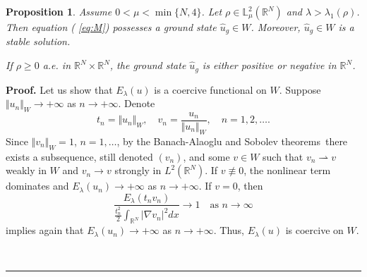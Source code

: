 \documentclass[12pt,thmsa]{article}
\newtheorem{proposition}[theorem]{Proposition}
\newenvironment{proof}[1][Proof]{\noindent\textbf{#1.} }{\ \rule{0.5em}{0.5em}}
\begin{document}
\begin{proposition}
\label{propGS} Assume $0<\mu <\min \{N,4\}$. Let $\rho \in \mathbb{L}_{\mu
}^{2}(\mathbb{R}^{N})$ and $\lambda >\lambda _{1}(\rho )$. Then equation (%
\ref{eq:M}) possesses a ground state $\hat{u}_{g}\in W$. Moreover, $\hat{u}%
_{g}\in W$ is a stable solution.

If $\rho \geq 0$ a.e. in $\mathbb{R}^N\times \mathbb{R}^N$, the ground state
$\hat{u}_g$ is either positive or negative in $\mathbb{R}^{N}$.
\end{proposition}

\begin{proof}
Let us show that $E_{\lambda }(u)$ is a coercive functional on $W$. Suppose $%
\Vert u_{n}\Vert _{W}\rightarrow +\infty $ as $n\rightarrow +\infty $.
Denote
\begin{equation*}
t_{n}=\Vert u_{n}\Vert _{W},\quad v_{n}=\frac{u_{n}}{\Vert u_{n}\Vert _{W}}%
,\quad n=1,2,\dots .
\end{equation*}%
Since $\Vert v_{n}\Vert _{W}=1$, $n=1,\ldots $, by the Banach-Alaoglu and
Sobolev theorems\ there exists a subsequence, still denoted $(v_{n})$, and
some $v\in W$ such that $v_{n}\rightharpoonup v$ weakly in $W$ and $%
v_{n}\rightarrow v$ strongly in $L^{2}(\mathbb{R}^{N}).$ If $v\not\equiv 0$,
the nonlinear term dominates and $E_{\lambda }(u_{n})\rightarrow +\infty $
as $n\rightarrow +\infty $. If $v=0$, then
\begin{equation*}
\frac{E_{\lambda }(t_{n}v_{n})}{\frac{t_{n}^{2}}{2}\int_{\mathbb{R}%
^{N}}|\nabla v_{n}|^{2}dx}\rightarrow 1\quad \text{as }n\rightarrow \infty
\end{equation*}%
implies again that $E_{\lambda }(u_{n})\rightarrow +\infty $ as $%
n\rightarrow +\infty $. Thus, $E_{\lambda }(u)$ is coercive on $W$.


\end{proof}
\end{document}
